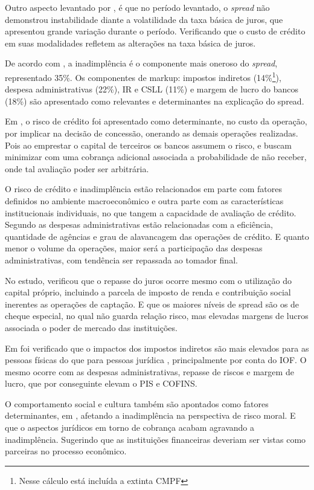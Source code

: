 \documentclass[
  12pt,
  12pt,
  openright,
  oneside,
  a4paper,
  chapter=TITLE,
  section=TITLE,
  subsection=TITLE,
  subsubsection=TITLE,
  english,
  portugues,
  sumario=tradicional]{abntex2}
\begin{document}
Outro aspecto levantado por \textcite{BCB:1999}, é que no período levantado, o \emph{spread} não demonstrou instabilidade diante a volatilidade da taxa básica de juros, que apresentou grande variação durante o período. Verificando que o custo de crédito em suas modalidades refletem as alterações na taxa básica de juros.

De acordo com \textcite{BCB:1999}, a inadimplência é o componente mais oneroso do \emph{spread}, representado 35\%. Os componentes de markup: impostos indiretos (14\%\footnote{Nesse cálculo está incluída a extinta CMPF}), despesa administrativas (22\%), IR e CSLL (11\%) e margem de lucro do bancos (18\%) são apresentado como relevantes e determinantes na explicação do spread.

Em \textcite{BCB:1999}, o risco de crédito foi apresentado como determinante, no custo da operação, por implicar na decisão de concessão, onerando as demais operações realizadas. Pois ao emprestar o capital de terceiros os bancos assumem o risco, e buscam minimizar com uma cobrança adicional associada a probabilidade de não receber, onde tal avaliação poder ser arbitrária.

O risco de crédito e inadimplência estão relacionados em parte com fatores definidos no ambiente macroeconômico e outra parte com as características institucionais individuais, no que tangem a capacidade de avaliação de crédito.
Segundo \textcite{BCB:1999} as despesas administrativas estão relacionadas com a eficiência, quantidade de agências e grau de alavancagem das operações de crédito. E quanto menor o volume da operações, maior será a participação das despesas administrativas, com tendência ser repassada ao tomador final.

No estudo, \textcite{BCB:1999} verificou que o repasse do juros ocorre mesmo com o utilização do capital próprio, incluindo a parcela de imposto de renda e contribuição social inerentes as operações de captação. E que os maiores níveis de spread são os de cheque especial, no qual não guarda relação risco, mas elevadas margens de lucros associada o poder de mercado das instituições.

Em \textcite{BCB:1999} foi verificado que o impactos dos impostos indiretos são mais elevados para as pessoas físicas do que para pessoas jurídica , principalmente por conta do IOF. O mesmo ocorre com as despesas administrativas, repasse de riscos e margem de lucro, que por conseguinte elevam o PIS e COFINS.

O comportamento social e cultura também são apontados como fatores determinantes, em \textcite{BCB:1999}, afetando a inadimplência na perspectiva de risco moral. E que o aspectos jurídicos em torno de cobrança acabam agravando a inadimplência. Sugerindo que as instituições financeiras deveriam ser vistas como parceiras no processo econômico.
\end{document}
